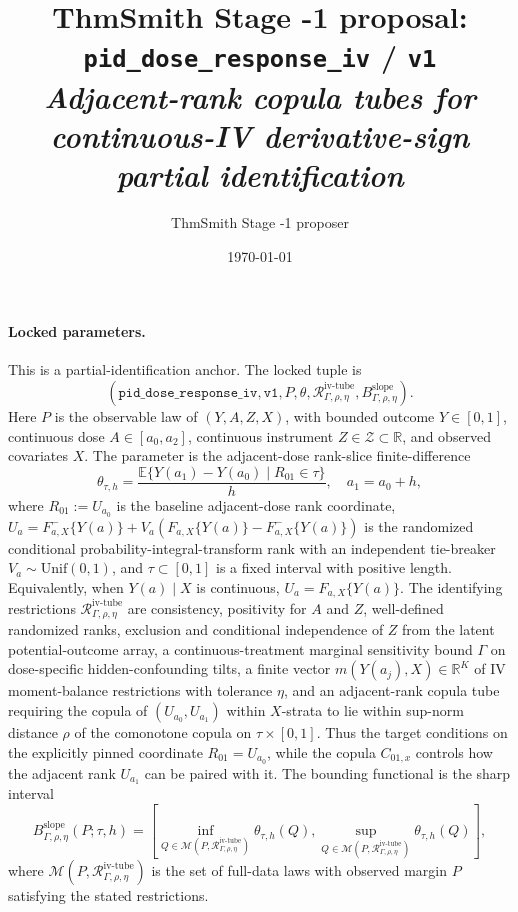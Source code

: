 \documentclass[11pt]{article}
\title{ThmSmith Stage -1 proposal: \texttt{pid\_dose\_response\_iv} / \texttt{v1}%
  \\ \large\textit{Adjacent-rank copula tubes for continuous-IV derivative-sign partial identification}}
\author{ThmSmith Stage -1 proposer}
\date{\today}
\newcommand{\E}{\mathbb{E}}
\theoremstyle{definition}
\theoremstyle{plain}
\theoremstyle{remark}
\begin{document}
\maketitle


\paragraph{Locked parameters.}
This is a partial-identification anchor.  The locked tuple is
\[
(\texttt{pid\_dose\_response\_iv},\texttt{v1},
P,\theta,\mathcal R_{\Gamma,\rho,\eta}^{\mathrm{iv\text{-}tube}},B_{\Gamma,\rho,\eta}^{\mathrm{slope}}).
\]
Here \(P\) is the observable law of \((Y,A,Z,X)\), with bounded outcome \(Y\in[0,1]\), continuous dose \(A\in[a_0,a_2]\), continuous instrument \(Z\in\mathcal Z\subset\mathbb R\), and observed covariates \(X\).  The parameter is the adjacent-dose rank-slice finite-difference
\[
\theta_{\tau,h}=\frac{\E\{Y(a_1)-Y(a_0)\mid R_{01}\in\tau\}}{h},
\quad a_1=a_0+h,
\]
where \(R_{01}:=U_{a_0}\) is the baseline adjacent-dose rank coordinate, \(U_a=F^-_{a,X}\{Y(a)\}+V_a(F_{a,X}\{Y(a)\}-F^-_{a,X}\{Y(a)\})\) is the randomized conditional probability-integral-transform rank with an independent tie-breaker \(V_a\sim\mathrm{Unif}(0,1)\), and \(\tau\subset[0,1]\) is a fixed interval with positive length.  Equivalently, when \(Y(a)\mid X\) is continuous, \(U_a=F_{a,X}\{Y(a)\}\).  The identifying restrictions \(\mathcal R_{\Gamma,\rho,\eta}^{\mathrm{iv\text{-}tube}}\) are consistency, positivity for \(A\) and \(Z\), well-defined randomized ranks, exclusion and conditional independence of \(Z\) from the latent potential-outcome array, a continuous-treatment marginal sensitivity bound \(\Gamma\) on dose-specific hidden-confounding tilts, a finite vector \(m(Y(a_j),X)\in\mathbb R^K\) of IV moment-balance restrictions with tolerance \(\eta\), and an adjacent-rank copula tube requiring the copula of \((U_{a_0},U_{a_1})\) within \(X\)-strata to lie within sup-norm distance \(\rho\) of the comonotone copula on \(\tau\times[0,1]\).  Thus the target conditions on the explicitly pinned coordinate \(R_{01}=U_{a_0}\), while the copula \(C_{01,x}\) controls how the adjacent rank \(U_{a_1}\) can be paired with it.  The bounding functional is the sharp interval
\[
B_{\Gamma,\rho,\eta}^{\mathrm{slope}}(P;\tau,h)=
\left[\inf_{Q\in\mathcal M(P,\mathcal R_{\Gamma,\rho,\eta}^{\mathrm{iv\text{-}tube}})}\theta_{\tau,h}(Q),
\sup_{Q\in\mathcal M(P,\mathcal R_{\Gamma,\rho,\eta}^{\mathrm{iv\text{-}tube}})}\theta_{\tau,h}(Q)\right],
\]
where \(\mathcal M(P,\mathcal R_{\Gamma,\rho,\eta}^{\mathrm{iv\text{-}tube}})\) is the set of full-data laws with observed margin \(P\) satisfying the stated restrictions.
\end{document}
